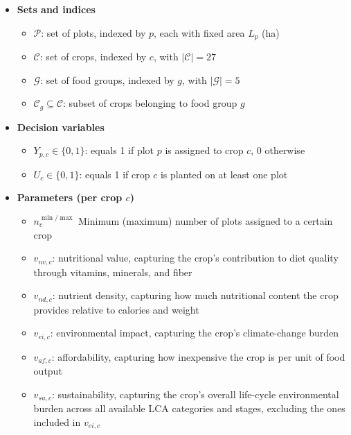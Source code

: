 \documentclass[conference]{IEEEtran}
\begin{document}
\begin{itemize}[nosep,leftmargin=*]

\item \textbf{Sets and indices}
\begin{itemize}[nosep,leftmargin=*]
    \item $\mathcal{P}$: set of plots, indexed by $p$, each with fixed area $L_p$ (ha)
    \item $\mathcal{C}$: set of crops, indexed by $c$, with $|\mathcal{C}| = 27$
    \item $\mathcal{G}$: set of food groups, indexed by $g$, with $|\mathcal{G}| = 5$
    \item $\mathcal{C}_g \subseteq \mathcal{C}$: subset of crops belonging to food group $g$
\end{itemize}

\item \textbf{Decision variables}
\begin{itemize}[nosep,leftmargin=*]
    \item $Y_{p,c} \in \{0,1\}$: equals 1 if plot $p$ is assigned to crop $c$, 0 otherwise
    \item $U_c \in \{0,1\}$: equals 1 if crop $c$ is planted on at least one plot
\end{itemize}

\item \textbf{Parameters (per crop $c$)}
\begin{itemize}[nosep,leftmargin=*]
    \item $n_c^{\min/\max}$ Minimum (maximum) number of plots assigned to a certain crop
    \item $v_{nv,c}$: nutritional value, capturing the crop's contribution to diet quality through vitamins, minerals, and fiber
    \item $v_{nd,c}$: nutrient density, capturing how much nutritional content the crop provides relative to calories and weight
    \item $v_{ei,c}$: environmental impact, capturing the crop's climate-change burden
    \item $v_{af,c}$: affordability, capturing how inexpensive the crop is per unit of food output
    \item $v_{su,c}$: sustainability, capturing the crop's overall life-cycle environmental burden across all available LCA categories and stages, excluding the ones included in $v_{ei,c}$
\end{itemize}

\end{itemize}
\end{document}
